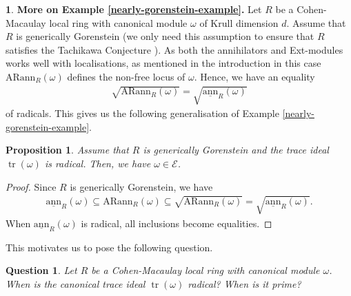 \documentclass[12pt]{amsart}
\newcommand{\sann}{\underline{\mathrm{ann}}}
\newcommand{\arann}{\mathrm{ARann}}
\newcommand{\EE}{\mathcal{E}}
\newtheorem{proposition}[theorem]{Proposition}
\newtheorem{question}[theorem]{Question}
\theoremstyle{definition}
\newtheorem{chunk}[theorem]{}
\numberwithin{equation}{theorem}
\DeclareMathOperator{\tr}{\mathrm{tr}}
\begin{document}
\begin{chunk}
    \textbf{More on Example \ref{nearly-gorenstein-example}.} Let $R$ be a Cohen-Macaulay local ring with canonical module $\omega$ of Krull dimension $d$. Assume that $R$ is generically Gorenstein (we only need this assumption to ensure that $R$ satisfies the Tachikawa Conjecture \cite{Avramov-Buchweitz-Sega}). As both the annihilators and Ext-modules works well with localisations, as mentioned in the introduction in this case $\arann_R(\omega)$ defines the non-free locus of $\omega$. Hence, we have an equality 
    \begin{align*}
    \sqrt{\arann_R(\omega)} = \sqrt{\sann_R(\omega)} 
    \end{align*}
    of radicals. This gives us the following generalisation of Example \ref{nearly-gorenstein-example}.
    \begin{proposition}\label{radical-canonical-trace-proposition}
    Assume that $R$ is generically Gorenstein and the trace ideal $\tr(\omega)$ is radical. Then, we have $\omega \in \EE$.    
    \end{proposition}
    \begin{proof}
        Since $R$ is generically Gorenstein, we have
        \begin{align*}
            \sann_R(\omega) \subseteq \arann_R(\omega) \subseteq \sqrt{\arann_R(\omega)} = \sqrt{\sann_R(\omega)}. 
            \end{align*}
        When $\sann_R(\omega)$ is radical, all inclusions become equalities.
    \end{proof}
This motivates us to pose the following question.
\begin{question}
    Let $R$ be a Cohen-Macaulay local ring with canonical module $\omega$. When is the canonical trace ideal $\tr(\omega)$ radical? When is it prime?
\end{question}


\end{chunk}
\end{document}
